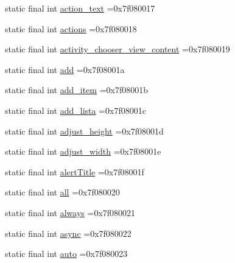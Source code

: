 \begin{DoxyCompactItemize}
\item 
static final int \mbox{\hyperlink{classbr_1_1unb_1_1cic_1_1mp_1_1marketmaster_1_1R_1_1id_acc828c24601cae666a6f5a4740bfaa60}{action\+\_\+text}} =0x7f080017
\item 
static final int \mbox{\hyperlink{classbr_1_1unb_1_1cic_1_1mp_1_1marketmaster_1_1R_1_1id_a24a08ac8b43cd5e811908c55984ea19a}{actions}} =0x7f080018
\item 
static final int \mbox{\hyperlink{classbr_1_1unb_1_1cic_1_1mp_1_1marketmaster_1_1R_1_1id_ac414f52a64c237d116d38ccca3b7240d}{activity\+\_\+chooser\+\_\+view\+\_\+content}} =0x7f080019
\item 
static final int \mbox{\hyperlink{classbr_1_1unb_1_1cic_1_1mp_1_1marketmaster_1_1R_1_1id_a9ad0b07fa45593d896205da3ecca8f42}{add}} =0x7f08001a
\item 
static final int \mbox{\hyperlink{classbr_1_1unb_1_1cic_1_1mp_1_1marketmaster_1_1R_1_1id_a1e79e58d6d24f735cdfc54c5dde4b6a3}{add\+\_\+item}} =0x7f08001b
\item 
static final int \mbox{\hyperlink{classbr_1_1unb_1_1cic_1_1mp_1_1marketmaster_1_1R_1_1id_a5bbce37e234128f4f0e49de71db8bf7a}{add\+\_\+lista}} =0x7f08001c
\item 
static final int \mbox{\hyperlink{classbr_1_1unb_1_1cic_1_1mp_1_1marketmaster_1_1R_1_1id_a6443939aeabb6008b5b59ceab55bb68a}{adjust\+\_\+height}} =0x7f08001d
\item 
static final int \mbox{\hyperlink{classbr_1_1unb_1_1cic_1_1mp_1_1marketmaster_1_1R_1_1id_ad31ea9231d05b38d293476b573343aea}{adjust\+\_\+width}} =0x7f08001e
\item 
static final int \mbox{\hyperlink{classbr_1_1unb_1_1cic_1_1mp_1_1marketmaster_1_1R_1_1id_a43192662746fa48808a8f3ffe01f9842}{alert\+Title}} =0x7f08001f
\item 
static final int \mbox{\hyperlink{classbr_1_1unb_1_1cic_1_1mp_1_1marketmaster_1_1R_1_1id_a01854ebb7b9ab0e4165d2b3e6887cc32}{all}} =0x7f080020
\item 
static final int \mbox{\hyperlink{classbr_1_1unb_1_1cic_1_1mp_1_1marketmaster_1_1R_1_1id_aeaa9510338884a83b3dc485ab7afa192}{always}} =0x7f080021
\item 
static final int \mbox{\hyperlink{classbr_1_1unb_1_1cic_1_1mp_1_1marketmaster_1_1R_1_1id_ae8bdcef4ab086d729bf4e47e5778e557}{async}} =0x7f080022
\item 
static final int \mbox{\hyperlink{classbr_1_1unb_1_1cic_1_1mp_1_1marketmaster_1_1R_1_1id_ae955b426171962493930189e11fa31c1}{auto}} =0x7f080023
\item 

\end{DoxyCompactItemize}
